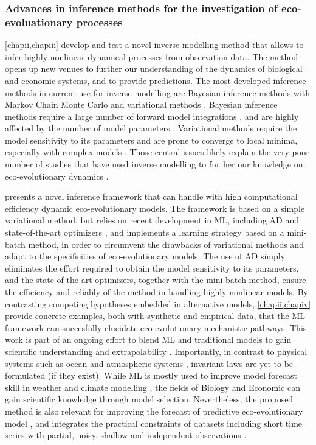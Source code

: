 \subsubsection{Advances in inference methods for the investigation of eco-evoluationary processes}

\cref{chapii,chapiii} develop and test a novel inverse modelling method that allows to infer highly nonlinear dynamical processes from observation data. The method opens up new venues to further our understanding of the dynamics of biological and economic systems, and to provide predictions.
% 
The most developed inference methods in current use for inverse modelling are Bayesian inference methods with Markov Chain Monte Carlo \xxx and variational methods \xxx.
% 
% 
Bayesian inference methods require a large number of forward model integrations \citep{Schneider2017}, and are highly affected by the number of model parameters \citep{Csillery2010}.
% 
Variational methods require the model sensitivity to its parameters \xxx and are prone to converge to local minima, especially with complex models \citep{XXX}.
% 
Those central issues likely explain the very poor number of studies that have used inverse modelling to further our knowledge on eco-evolutionary dynamics \xxx. 
% 

%
\chapii presents a novel inference framework that can handle with high computational efficiency dynamic eco-evolutionary models.
% 
The framework is based on a simple variational method, but relies on recent development in ML, including AD \citep{Rackauckas2020a} and state-of-the-art optimizers \citep{Kingma2014}, and implements a learning strategy based on a mini-batch method, in order to circumvent the drawbacks of variational methods and adapt to the specificities of eco-evolutionary models. 
% 
The use of AD simply eliminates the effort required to obtain the model sensitivity to its parameters, and the state-of-the-art optimizers, together with the mini-batch method, ensure the efficiency and reliably of the method in handling highly nonlinear models.
% 
By contrasting competing hypotheses embedded in alternative models, \cref{chapii,chapiv} provide concrete examples, both with synthetic and empirical data, that the ML framework can succesfully elucidate eco-evolutionary mechanistic pathways.
% 
This work is part of an ongoing effort to blend ML and traditional models to gain scientific understanding and extrapolability \citep{XXX}. Importantly, in contrast to physical systems such as ocean and atmospheric systems \xxx, invariant laws are yet to be formulated (if they exist). While ML is mostly used to improve model forecast skill in weather and climate modelling \xxx, the fields of Biology and Economic can gain scientific knowledge through model selection. 
% 
Nevertheless, the proposed method is also relevant for improving the forecast of predictive eco-evolutionary model \citep{Urban2016}, and integrates the practical constraints of datasets including short time series with partial, noisy, shallow and independent observations \citep{Dornelas2018}.

